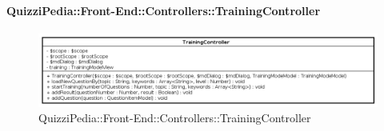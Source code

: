 \paragraph{QuizziPedia::Front-End::Controllers::TrainingController}
\begin{figure} [ht]
	\centering
	\includegraphics[scale=0.45]{UML/Classi/Front-End/QuizziPedia_Front-end_Controller_TrainingController.png}
	\caption{QuizziPedia::Front-End::Controllers::TrainingController}
\end{figure} \FloatBarrier
